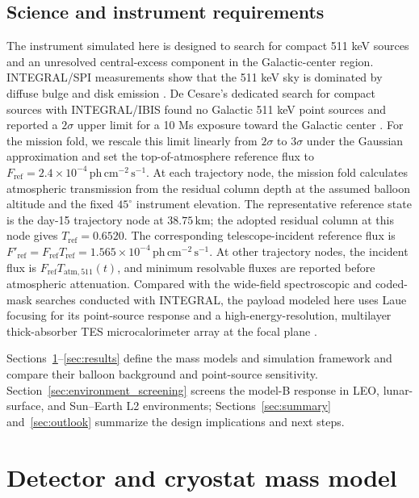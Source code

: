 \documentclass[11pt]{article}
\newcommand{\phcms}{\ensuremath{\,\mathrm{ph\,cm^{-2}\,s^{-1}}}}
\newcommand{\fref}{F_{\mathrm{ref}}}
\begin{document}
\subsection{Science and instrument requirements}
\label{sec:requirements}

\begingroup
{}

The instrument simulated here is designed to search for compact 511 keV sources
and an unresolved central-excess component in the Galactic-center region.
INTEGRAL/SPI measurements show that the 511 keV sky is dominated by diffuse
bulge and disk emission \cite{Siegert2016AA,Yoneda2025}. De Cesare's dedicated
search for compact sources with INTEGRAL/IBIS found no Galactic 511 keV point
sources and reported a $2\sigma$ upper limit for a 10 Ms exposure toward the
Galactic center \cite{DeCesare2011}. For the mission fold, we rescale this limit
linearly from $2\sigma$ to $3\sigma$ under the Gaussian approximation and set
the top-of-atmosphere reference flux to
$\fref=2.4\times10^{-4}\phcms$. At each trajectory node, the
mission fold calculates atmospheric transmission from the residual column depth
at the assumed balloon altitude and the fixed $45^\circ$ instrument elevation.
The representative reference state is the day-15 trajectory node at
$38.75\,\mathrm{km}$; the adopted residual column at this node gives
$T_{\mathrm{ref}}=0.6520$. The corresponding telescope-incident reference
flux is $F'_{\mathrm{ref}}=\fref T_{\mathrm{ref}}=
1.565\times10^{-4}\phcms$. At other trajectory nodes, the incident flux is
$\fref T_{\mathrm{atm},511}(t)$, and minimum resolvable fluxes are reported
before atmospheric attenuation. Compared with the wide-field
spectroscopic and coded-mask searches conducted with INTEGRAL, the payload
modeled here uses Laue focusing for its point-source response and a
high-energy-resolution, multilayer thick-absorber TES microcalorimeter array at
the focal plane \cite{Shirazi2023,Caputo2017}.



Sections~\ref{sec:geometry}--\ref{sec:results} define the mass models and
simulation framework and compare their balloon background and point-source
sensitivity. Section~\ref{sec:environment_screening} screens the model-B
response in LEO, lunar-surface, and Sun--Earth L2 environments;
Sections~\ref{sec:summary} and~\ref{sec:outlook} summarize the design
implications and next steps.

\endgroup

\section{Detector and cryostat mass model}
\label{sec:geometry}
\end{document}
